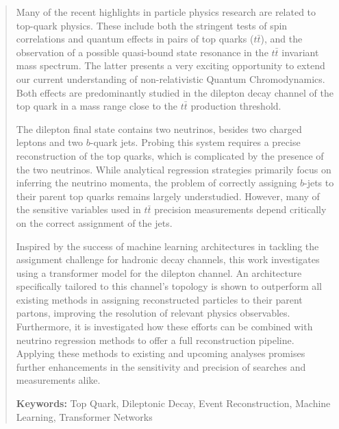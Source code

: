 \documentclass[master,
               oneside,
               BCOR=0mm,
               ngerman,
               english,
               final,          %
               ]{GAUBM}
\begin{document}




\frontmatter
\maketitle
\cleardoublepage
\begin{abstract}
  \noindent Many of the recent highlights in particle physics research are related to top-quark physics. These include both the stringent tests of spin correlations and quantum effects in pairs of top quarks ($t\bar{t}$), and the observation of a possible quasi-bound state resonance in the $t\bar{t}$
  invariant mass spectrum. The latter presents a very exciting opportunity to extend our current understanding of non-relativistic Quantum Chromodynamics. Both effects are predominantly studied in the dilepton decay channel of the top quark in a mass range close to the $t\bar{t}$ production threshold.

  The dilepton final state contains two neutrinos, besides two charged leptons and two $b$-quark jets. Probing this system requires a precise reconstruction of the top quarks, which is complicated by the presence of the two neutrinos.  While analytical regression strategies primarily focus on inferring the neutrino momenta, the problem of correctly assigning $b$-jets to their parent top quarks remains largely understudied. However, many of the sensitive variables used in $t\bar{t}$  precision measurements depend critically on the correct assignment of the jets.

  Inspired by the success of machine learning architectures in tackling the assignment challenge for hadronic decay channels, this work investigates using a transformer model for the dilepton channel. An architecture specifically tailored to this channel's topology is shown to outperform all existing methods in assigning reconstructed particles to their parent partons, improving the resolution of relevant physics observables. Furthermore, it is investigated how these efforts can be combined with neutrino regression methods to offer a full reconstruction pipeline. Applying these methods to existing and upcoming analyses promises further enhancements in the sensitivity and precision of searches and measurements alike.
  \bigskip\par
  \textbf{Keywords:} Top Quark, Dileptonic Decay,  Event Reconstruction, Machine Learning, Transformer Networks
\end{abstract}
\end{document}
